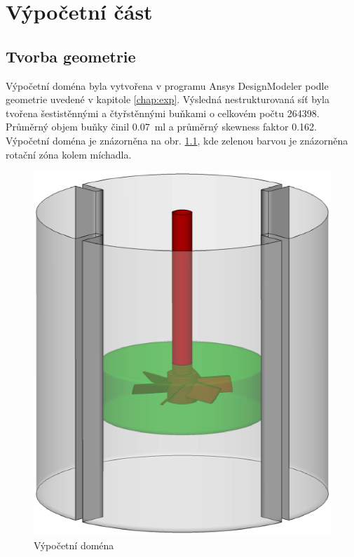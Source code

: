 \chapter{Výpočetní část}

\section{Tvorba geometrie}

Výpočetní doména byla vytvořena v programu Ansys DesignModeler podle geometrie uvedené v kapitole \ref{chap:exp}. Výsledná nestrukturovaná síť byla tvořena šestistěnnými a čtyřstěnnými buňkami o celkovém počtu \num{264398}. Průměrný objem buňky činil \SI{0.07}{\milli\litre} a průměrný skewness faktor \num{0.162}. Výpočetní doména je znázorněna na obr. \ref{fig:geo}, kde zelenou barvou je znázorněna rotační zóna kolem míchadla. 

\begin{figure}[h!]
\begin{center}
\includegraphics[scale=0.3]{images/geo.eps}
\caption{Výpočetní doména}
\label{fig:geo}
\end{center}
\end{figure} 

